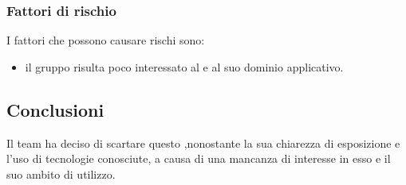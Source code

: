		\subsubsection {Fattori di rischio}
		I fattori che possono causare rischi sono:
			\begin {itemize}
				\item il gruppo risulta poco interessato al  e al suo dominio applicativo.
			\end {itemize}
	\subsection {Conclusioni}
	Il team ha deciso di scartare questo ,nonostante la sua chiarezza di esposizione e l'uso di tecnologie conosciute, a causa di una mancanza di interesse in esso e il suo ambito di utilizzo.